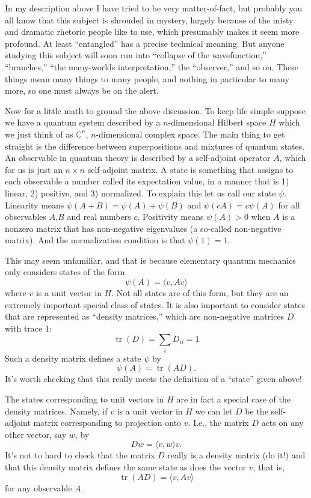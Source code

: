 \documentclass{article}
\begin{document}
In my description above I have tried to be very matter-of-fact, but
probably you all know that this subject is shrouded in mystery, largely
because of the misty and dramatic rhetoric people like to use, which
presumably makes it seem more profound. At least ``entangled'' has a
precise technical meaning. But anyone studying this subject will soon
run into ``collapse of the wavefunction,'' ``branches,'' ``the
many-worlds interpretation,'' the ``observer,'' and so on. These things
mean many things to many people, and nothing in particular to many more,
so one must always be on the alert.

Now for a little math to ground the above discussion. To keep life
simple suppose we have a quantum system described by a \(n\)-dimensional
Hilbert space \(H\) which we just think of as \(\mathbb{C}^n\),
\(n\)-dimensional complex space. The main thing to get straight is the
difference between superpositions and mixtures of quantum states. An
observable in quantum theory is described by a self-adjoint operator
\(A\), which for us is just an \(n\times n\) self-adjoint matrix. A
state is something that assigns to each observable a number called its
expectation value, in a manner that is 1) linear, 2) positive, and 3)
normalized. To explain this let us call our state \(\psi\). Linearity
means \(\psi(A + B) = \psi(A) + \psi(B)\) and \(\psi(cA) = c \psi(A)\)
for all observables \(A\),\(B\) and real numbers \(c\). Positivity means
\(\psi(A) > 0\) when \(A\) is a nonzero matrix that has non-negative
eigenvalues (a so-called non-negative matrix). And the normalization
condition is that \(\psi(1) = 1\).

This may seem unfamiliar, and that is because elementary quantum
mechanics only considers states of the form
\[\psi(A) = \langle v, Av\rangle\] where \(v\) is a unit vector in
\(H\). Not all states are of this form, but they are an extremely
important special class of states. It is also important to consider
states that are represented as ``density matrices,'' which are
non-negative matrices \(D\) with trace 1:
\[\operatorname{tr}(D) = \sum_i D_{ii} = 1\] Such a density matrix
defines a state \(\psi\) by \[\psi(A) = \operatorname{tr}(AD).\] It's
worth checking that this really meets the definition of a ``state''
given above!

The states corresponding to unit vectors in \(H\) are in fact a special
case of the density matrices. Namely, if \(v\) is a unit vector in \(H\)
we can let \(D\) be the self-adjoint matrix corresponding to projection
onto \(v\). I.e., the matrix \(D\) acts on any other vector, say \(w\),
by \[Dw = \langle v,w \rangle v.\] It's not to hard to check that the
matrix \(D\) really is a density matrix (do it!) and that this density
matrix defines the same state as does the vector \(v\), that is,
\[\operatorname{tr}(AD) = \langle v, Av\rangle\] for any observable
\(A\).
\end{document}

